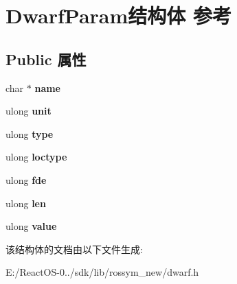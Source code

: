\hypertarget{struct_dwarf_param}{}\section{Dwarf\+Param结构体 参考}
\label{struct_dwarf_param}
\subsection*{Public 属性}
\begin{DoxyCompactItemize}
\item 
\mbox{\label{struct_dwarf_param_a480559e0783938fb4442e5d785df3bf3}} 
char $\ast$ {\bfseries name}
\item 
\mbox{\label{struct_dwarf_param_ac67f44dfc198e4c7d26bab15cf065f9e}} 
ulong {\bfseries unit}
\item 
\mbox{\label{struct_dwarf_param_a4f5bd5178953e95df4e932de38dc949c}} 
ulong {\bfseries type}
\item 
\mbox{\label{struct_dwarf_param_ab63c5c45209bbc31ded3ba4a3b284abb}} 
ulong {\bfseries loctype}
\item 
\mbox{\label{struct_dwarf_param_a526f298b997b14611b633062a5568896}} 
ulong {\bfseries fde}
\item 
\mbox{\label{struct_dwarf_param_ae41c9c82a8eac2a521668b09a1bdf42c}} 
ulong {\bfseries len}
\item 
\mbox{\label{struct_dwarf_param_aae23892ceb87537f84d583dc39dae6e5}} 
ulong {\bfseries value}
\end{DoxyCompactItemize}


该结构体的文档由以下文件生成\+:\begin{DoxyCompactItemize}
\item 
E\+:/\+React\+O\+S-\/0../sdk/lib/rossym\+\_\+new/dwarf.\+h\end{DoxyCompactItemize}
